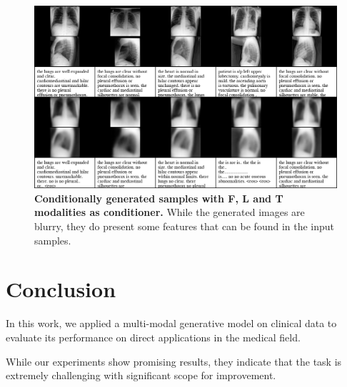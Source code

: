 \documentclass{midl} %
\begin{document}
    \begin{figure}
        \centering
        \includegraphics[width=\textwidth]{data/cond_gen/Lateral_PA_text}
        \caption{
            \textbf{Conditionally generated samples with F, L and T modalities as conditioner.} While the generated images are blurry, they do present some features that can be found in the input samples.
        }
        \label{fig:fig_cond_latPAtext}
    \end{figure}
    
    

\section{Conclusion}
    In this work, we applied a multi-modal generative model on clinical data to evaluate its performance on direct applications in the medical field.
    
    While our experiments show promising results, they indicate that the task is extremely challenging with significant scope for improvement.
    
\end{document}
